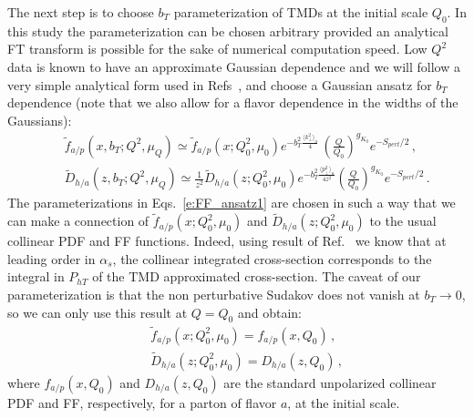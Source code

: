 \documentclass[final,3p,times,onecolumn,sort&compress,hidelinks]{elsarticle}
\newcommand\3[1]{\boldsymbol{#1}}
\begin{document}
The next step is to choose $b_T$ parameterization of TMDs at the initial scale $Q_0$. In this study the parameterization can be chosen arbitrary provided an analytical FT transform is possible for the sake of numerical computation speed. Low $Q^2$ data is known \cite{Schweitzer:2010tt} to have an approximate Gaussian dependence and we will follow a very simple analytical form used in Refs~\cite{Anselmino:2013lza,Signori:2013mda}, and choose a Gaussian ansatz for $b_T$ dependence (note that we also allow for a flavor dependence in the widths of the Gaussians):
\begin{eqnarray}
&&\tilde f_{a/p} (x,b_T; Q^2, \mu_Q)\simeq \tilde f_{a/p} (x; Q_0^2, \mu_0) {e^{-b_T^2 \frac{\langle k_\perp^2 \rangle_a}{4}}}\,\left( \frac{Q}{Q_0}\right)^{g_{K_0}}e^{-S_{pert}/2}\,,
\nonumber \\[0.3cm]
&&\tilde D_{h/a}(z,b_T; Q^2, \mu_Q)\simeq \frac{1}{z^2} \tilde D_{h/a}(z; Q_0^2, \mu_0) {e^{-b_T^2 \frac{\langle p_\perp^2 \rangle_a}{4 z^2}}}\left( \frac{Q}{Q_0}\right)^{g_{K_0}}e^{-S_{pert}/2}\,.
\label{e:FF_ansatz1}
\end{eqnarray}
The parameterizations in Eqs.~\eqref{e:FF_ansatz1} are chosen in such a way that we can make a connection of $\tilde f_{a/p} (x; Q_0^2, \mu_0)$ and $\tilde D_{h/a}(z; Q_0^2, \mu_0)$ to the usual collinear PDF and FF functions. Indeed, using result of Ref.~\cite{Collins:2016hqq} we know that at leading order in $\alpha_s$, the collinear integrated cross-section corresponds to the integral in $P_{hT}$ of the TMD approximated cross-section. The caveat of our parameterization is that the non perturbative Sudakov does not vanish at $b_T\to 0$, so we can only use this result at $Q=Q_0$ and obtain:
\begin{eqnarray}
&&\tilde f_{a/p} (x; Q_0^2, \mu_0) = f_{a/p} (x, Q_0)\,,
\\[0.3cm]
&&\tilde D_{h/a}(z; Q_0^2, \mu_0) = D_{h/a}(z, Q_0)\,,
\label{e:FF_ansatz2}
\end{eqnarray}
where $f_{a/p} (x, Q_0)$ and $D_{h/a}(z, Q_0)$ are the standard unpolarized collinear PDF and FF, respectively, for a parton of flavor $a$, at the initial scale.
\end{document}
